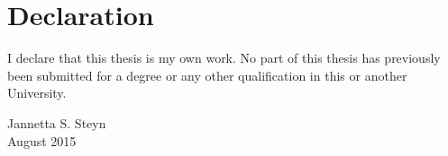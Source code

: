 \chapter{Declaration}
\label{chap:declaration}

I declare that this thesis is my own work. No part of this thesis has previously been submitted for a degree or any other qualification in this or another University.

Jannetta S. Steyn
\\
August 2015